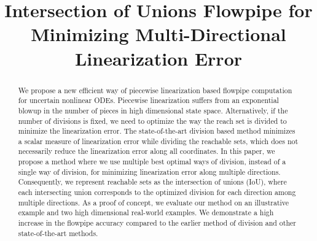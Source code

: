 


\title{Intersection of Unions Flowpipe for Minimizing Multi-Directional Linearization Error}
\author{}
\institute{}
%
    
\maketitle
%
\begin{abstract}
We propose a new efficient way of piecewise linearization based
flowpipe computation for uncertain nonlinear ODEs.  Piecewise
linearization suffers from an exponential blowup in the number of pieces
in high dimensional state space.  Alternatively, if the number of
divisions is fixed, we need to optimize the way the reach set is
divided to minimize the linearization error. 
The state-of-the-art division based method minimizes a scalar measure of linearization error while dividing the reachable sets, which does not necessarily
reduce the linearization error along all coordinates.  
In this paper, we propose a method where we use multiple best optimal ways of division, instead of a single way of division, for minimizing linearization error along multiple directions. Consequently, we
represent reachable sets as the intersection of unions
(IoU), where each intersecting union corresponds to the optimized
division for each direction among multiple directions.  As a proof of
concept, we evaluate our method on an illustrative example and two
high dimensional real-world examples.  We demonstrate a high increase
in the flowpipe accuracy compared to the earlier method of division
and other state-of-the-art methods.

\end{abstract}

